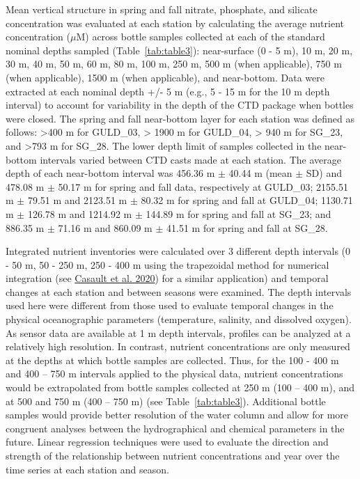 \documentclass[12pt]{article}\usepackage[]{graphicx}\usepackage[]{color}
\begin{document}
Mean vertical structure in spring and fall nitrate, phosphate, and silicate concentration was evaluated at each station by calculating the average nutrient concentration (\(\mu\)M) across bottle samples collected at each of the standard nominal depths sampled (Table~\ref{tab:table3}): near-surface (0 - 5 m), 10 m, 20 m, 30 m, 40 m, 50 m, 60 m, 80 m, 100 m, 250 m, 500 m (when applicable), 750 m (when applicable), 1500 m (when applicable), and near-bottom. Data were extracted at each nominal depth +/- 5 m (e.g., 5 - 15 m for the 10 m depth interval) to account for variability in the depth of the CTD package when bottles were closed. The spring and fall near-bottom layer for each station was defined as follows: \textgreater400 m for GULD\_03, \textgreater{} 1900 m for GULD\_04, \textgreater{} 940 m for SG\_23, and \textgreater793 m for SG\_28. The lower depth limit of samples collected in the near-bottom intervals varied between CTD casts made at each station. The average depth of each near-bottom interval was 456.36 m \(\pm\) 40.44 m (mean \(\pm\) SD) and 478.08 m \(\pm\) 50.17 m for spring and fall data, respectively at GULD\_03; 2155.51 m \(\pm\) 79.51 m and 2123.51 m \(\pm\) 80.32 m for spring and fall at GULD\_04; 1130.71 m \(\pm\) 126.78 m and 1214.92 m \(\pm\) 144.89 m for spring and fall at SG\_23; and 886.35 m \(\pm\) 71.16 m and 860.09 m \(\pm\) 41.51 m for spring and fall at SG\_28.

Integrated nutrient inventories were calculated over 3 different depth intervals (0 - 50 m, 50 - 250 m, 250 - 400 m using the trapezoidal method for numerical integration (see \protect\hyperlink{ref-casault_2020}{Casault et al. 2020}) for a similar application) and temporal changes at each station and between seasons were examined. The depth intervals used here were different from those used to evaluate temporal changes in the physical oceanographic parameters (temperature, salinity, and dissolved oxygen). As sensor data are available at 1 m depth intervals, profiles can be analyzed at a relatively high resolution. In contrast, nutrient concentrations are only measured at the depths at which bottle samples are collected. Thus, for the 100 - 400 m and 400 -- 750 m intervals applied to the physical data, nutrient concentrations would be extrapolated from bottle samples collected at 250 m (100 -- 400 m), and at 500 and 750 m (400 -- 750 m) (see Table~\ref{tab:table3}). Additional bottle samples would provide better resolution of the water column and allow for more congruent analyses between the hydrographical and chemical parameters in the future. Linear regression techniques were used to evaluate the direction and strength of the relationship between nutrient concentrations and year over the time series at each station and season.
\end{document}
